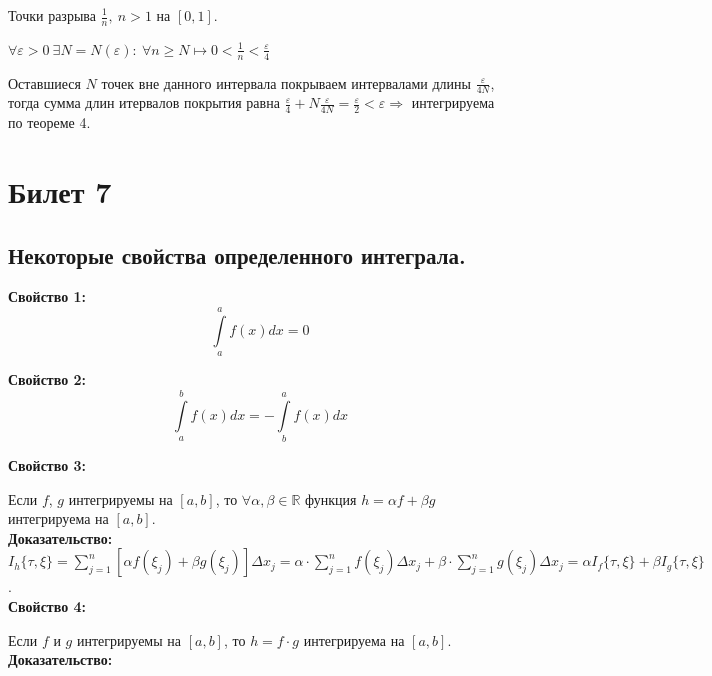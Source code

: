 \documentclass[a4paper,12pt]{article} %
\renewcommand {\geq}{\geqslant}
\begin{document}
Точки разрыва $\frac{1}{n},~n>1$ на $[0,1]$.

$\forall\varepsilon>0~\exists N=N(\varepsilon):~\forall n\geq N\longmapsto 0<\frac{1}{n}<\frac{\varepsilon}{4}$

Оставшиеся $N$ точек вне данного интервала покрываем интервалами длины $\frac{\varepsilon}{4N}$, тогда сумма длин итервалов покрытия равна $\frac{\varepsilon}{4}+N\frac{\varepsilon}{4N}=\frac{\varepsilon}{2}<\varepsilon\Rightarrow$ интегрируема по теореме 4.



\section{Билет 7}

\subsection{Некоторые свойства определенного интеграла.}

\textbf{Свойство 1:}
$$\int \limits_a^a f(x)dx = 0$$

\textbf{Свойство 2:}
$$\int \limits_a^b f(x)dx = -\int \limits_b^a f(x)dx$$

\textbf{Свойство 3:}

Если $ f $, $ g $ интегрируемы на $ [a, b] $, то $\forall{\alpha, \beta} \in \mathbb{R} $ функция $ h = \alpha f + \beta g $ интегрируема на $ [a, b] $.\\

\textbf{Доказательство:} \\[5 mm]
$ I_h \{ \tau, \xi \} = \sum\limits_{j = 1}^n   [\alpha f(\xi_j) + \beta g(\xi_j)] \Delta x_j  =  \alpha \cdot \sum\limits_{j = 1}^n f(\xi_j)\Delta x_j + \beta \cdot \sum\limits_{j = 1}^n g(\xi_j)\Delta x_j = \alpha I_f \{\tau, \xi \} + \beta I_g \{\tau, \xi \} $.\\

\textbf{Свойство 4:}

Если $ f $ и $ g $ интегрируемы на $ [a, b] $, то $ h = f \cdot g $ интегрируема на $ [a, b] $.\\

\textbf{Доказательство:}
\end{document}
